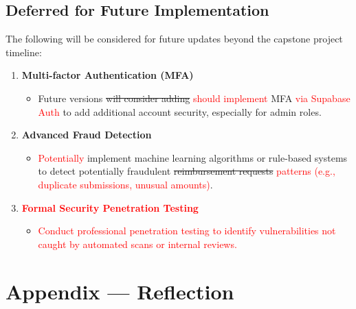 \documentclass{article}
\begin{document}
\subsection{Deferred for Future Implementation}

The following will be considered for future updates beyond the capstone project timeline:

\begin{enumerate}
    \item \textbf{Multi-factor Authentication (MFA)}
    \begin{itemize}
        \item Future versions \sout{will consider adding} \textcolor{red}{should implement} MFA \textcolor{red}{via Supabase Auth} to add additional account security, especially for admin roles.
    \end{itemize}

    \item \textbf{Advanced Fraud Detection}
    \begin{itemize}
        \item \textcolor{red}{Potentially} implement machine learning algorithms or rule-based systems to detect potentially fraudulent \sout{reimbursement requests} \textcolor{red}{patterns (e.g., duplicate submissions, unusual amounts)}.
    \end{itemize}
    \item \textcolor{red}{\textbf{Formal Security Penetration Testing}}
    \begin{itemize}
        \item \textcolor{red}{Conduct professional penetration testing to identify vulnerabilities not caught by automated scans or internal reviews.}
    \end{itemize}
\end{enumerate}

\newpage

\appendix
\section*{Appendix --- Reflection}


\end{document}
